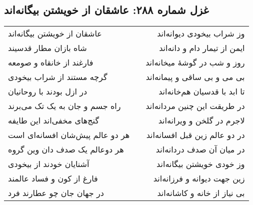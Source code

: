 \begin{center}
\section*{غزل شماره ۲۸۸: عاشقان از خویشتن بیگانه‌اند}
\label{sec:288}
\begin{longtable}{l p{0.5cm} r}
عاشقان از خویشتن بیگانه‌اند
&&
وز شراب بیخودی دیوانه‌اند
\\
شاه بازان مطار قدسیند
&&
ایمن از تیمار دام و دانه‌اند
\\
فارغند از خانقاه و صومعه
&&
روز و شب در گوشهٔ میخانه‌اند
\\
گرچه مستند از شراب بیخودی
&&
بی می و بی ساقی و پیمانه‌اند
\\
در ازل بودند با روحانیان
&&
تا ابد با قدسیان هم‌خانه‌اند
\\
راه جسم و جان به یک تک می‌برند
&&
در طریقت این چنین مردانه‌اند
\\
گنج‌های مخفی‌اند این طایفه
&&
لاجرم در گلخن و ویرانه‌اند
\\
هر دو عالم پیش‌شان افسانه‌ای است
&&
در دو عالم زین قبل افسانه‌اند
\\
هر دوعالم یک صدف دان وین گروه
&&
در میان آن صدف دردانه‌اند
\\
آشنایان خودند از بیخودی
&&
وز خودی خویشتن بیگانه‌اند
\\
فارغ از کون و فساد عالمند
&&
زین جهت دیوانه و فرزانه‌اند
\\
در جهان جان چو عطارند فرد
&&
بی نیاز از خانه و کاشانه‌اند
\\
\end{longtable}
\end{center}
